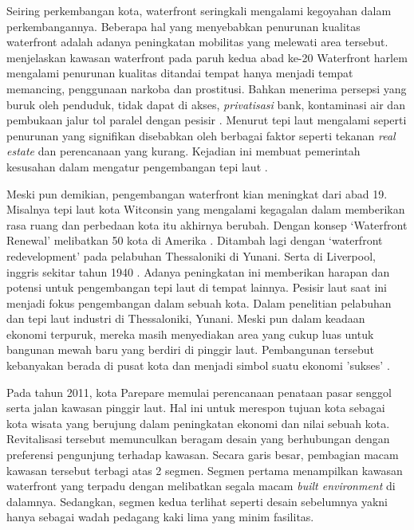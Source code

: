 \documentclass[../projects/thesis.tex]{subfiles}
\begin{document}
Seiring perkembangan kota, waterfront seringkali mengalami kegoyahan dalam perkembangannya. Beberapa hal yang menyebabkan penurunan kualitas  waterfront adalah adanya peningkatan mobilitas yang melewati area tersebut\citep{richarda.lehmann1966}. \cite{ulam2009} menjelaskan kawasan waterfront pada paruh kedua abad ke-20 Waterfront harlem mengalami penurunan kualitas ditandai tempat hanya menjadi tempat memancing, penggunaan narkoba dan prostitusi. Bahkan menerima persepsi yang buruk oleh penduduk, tidak dapat di akses, \textit{privatisasi} bank, kontaminasi air dan pembukaan jalur tol paralel dengan pesisir \citep{shamsuddin2013}. Menurut \cite{benages2015revisiting} tepi laut mengalami seperti penurunan yang signifikan disebabkan oleh berbagai faktor seperti tekanan \textit{real estate} dan perencanaan yang kurang. Kejadian ini membuat pemerintah kesusahan dalam mengatur pengembangan tepi laut \citep{gripaios1999ports}.


Meski pun demikian, pengembangan waterfront kian meningkat dari abad 19. Misalnya tepi laut kota Witconsin yang mengalami kegagalan dalam memberikan rasa ruang dan perbedaan kota itu akhirnya berubah. Dengan konsep `Waterfront Renewal' melibatkan 50 kota di Amerika \citep{richarda.lehmann1966}. Ditambah lagi dengan `waterfront redevelopment' pada pelabuhan Thessaloniki di Yunani. Serta di Liverpool, inggris sekitar tahun 1940 \citep{couch2003city}. Adanya peningkatan ini memberikan harapan dan potensi untuk pengembangan tepi laut di tempat lainnya.
Pesisir laut saat ini menjadi fokus pengembangan dalam sebuah kota. Dalam penelitian pelabuhan dan tepi laut industri di Thessaloniki, Yunani. Meski pun dalam keadaan ekonomi terpuruk, mereka masih menyediakan area yang cukup luas untuk bangunan mewah baru yang berdiri di pinggir laut. Pembangunan tersebut kebanyakan berada di pusat kota dan menjadi simbol suatu ekonomi 'sukses' \citep{vayona2011}.

Pada tahun 2011, kota Parepare memulai perencanaan penataan pasar senggol serta jalan kawasan pinggir laut. Hal ini untuk merespon tujuan kota sebagai kota wisata yang berujung dalam peningkatan ekonomi dan nilai sebuah kota. Revitalisasi tersebut memunculkan beragam desain yang berhubungan dengan  preferensi pengunjung terhadap kawasan. Secara garis besar, pembagian macam kawasan tersebut terbagi atas 2 segmen. Segmen pertama menampilkan kawasan waterfront yang terpadu dengan melibatkan segala macam \textit{built environment} di dalamnya. Sedangkan, segmen kedua terlihat seperti desain sebelumnya yakni hanya sebagai wadah pedagang kaki lima yang minim fasilitas.
\end{document}
